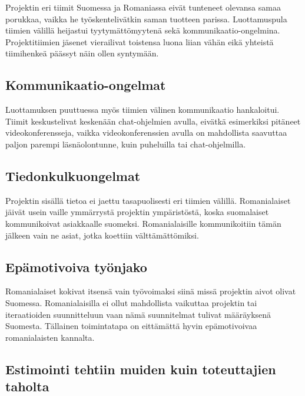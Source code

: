 \documentclass[a4paper]{article}
\begin{document}
Projektin eri tiimit Suomessa ja Romaniassa eivät tunteneet olevansa samaa porukkaa, vaikka he työskentelivätkin saman tuotteen parissa. Luottamuspula tiimien välillä heijastui tyytymättömyytenä sekä kommunikaatio-ongelmina. Projektitiimien jäsenet vierailivat toistensa luona liian vähän eikä yhteistä tiimihenkeä päässyt näin ollen syntymään. 

\subsection{Kommunikaatio-ongelmat}

Luottamuksen puuttuessa myös tiimien välinen kommunikaatio hankaloitui. Tiimit keskustelivat keskenään chat-ohjelmien avulla, eivätkä esimerkiksi pitäneet videokonferensseja, vaikka videokonferenssien avulla on mahdollista saavuttaa paljon parempi läsnäolontunne, kuin puheluilla tai chat-ohjelmilla.

\subsection{Tiedonkulkuongelmat}

Projektin sisällä tietoa ei jaettu tasapuolisesti eri tiimien välillä. Romanialaiset jäivät usein vaille ymmärrystä projektin ympäristöstä, koska suomalaiset kommunikoivat asiakkaalle suomeksi. Romanialaisille kommunikoitiin tämän jälkeen vain ne asiat, jotka koettiin välttämättömiksi.

\subsection{Epämotivoiva työnjako}

Romanialaiset kokivat itsensä vain työvoimaksi siinä missä projektin aivot olivat Suomessa. Romanialaisilla ei ollut mahdollista vaikuttaa projektin tai iteraatioiden suunnitteluun vaan nämä suunnitelmat tulivat määräyksenä Suomesta. Tällainen toimintatapa on eittämättä hyvin epämotivoivaa romanialaisten kannalta.

\subsection{Estimointi tehtiin muiden kuin toteuttajien taholta}
\end{document}
